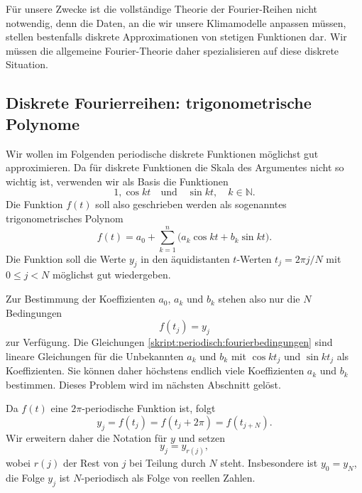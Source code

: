 Für unsere Zwecke ist die vollständige Theorie der Fourier-Reihen nicht
notwendig, denn die Daten, an die wir unsere Klimamodelle anpassen
müssen, stellen bestenfalls diskrete Approximationen von stetigen
Funktionen dar.
Wir müssen die allgemeine Fourier-Theorie daher spezialisieren auf diese
diskrete Situation.

\subsection{Diskrete Fourierreihen: trigonometrische Polynome}
Wir wollen im Folgenden periodische diskrete Funktionen möglichst gut
approximieren.
Da für diskrete Funktionen die Skala des Argumentes nicht so wichtig ist,
verwenden wir als Basis die Funktionen 
\begin{equation}
1,\cos kt\quad\text{und}\quad \sin kt,\quad k\in\mathbb N.
\end{equation}
Die Funktion $f(t)$ soll also geschrieben werden als sogenanntes 
trigonometrisches Polynom
\begin{equation}
f(t)
=
a_0 + \sum_{k=1}^n \bigl(a_k \cos kt + b_k\sin kt).
\label{skript:fourier:rekonstruktion}
\end{equation}
Die Funktion soll die Werte $y_j$ in den äquidistanten $t$-Werten 
$t_j=2\pi j/N$ mit $0\le j<N$ möglichst gut wiedergeben.

Zur Bestimmung der Koeffizienten $a_0$, $a_k$ und $b_k$ stehen also nur
die $N$ Bedingungen
\begin{equation}
f(t_j)=y_j
\label{skript:periodisch:fourierbedingungen}
\end{equation}
zur Verfügung.
Die Gleichungen \eqref{skript:periodisch:fourierbedingungen} sind
lineare Gleichungen für die Unbekannten $a_k$ und $b_k$ mit
$\cos kt_j$ und $\sin kt_j$ als Koeffizienten.
Sie können daher höchstens endlich viele Koeffizienten $a_k$ und $b_k$
bestimmen.
Dieses Problem wird im nächsten Abschnitt gelöst.

Da $f(t)$ eine $2\pi$-periodische Funktion ist, folgt
\[
y_j = f(t_j) = f(t_j+2\pi) = f(t_{j+N}).
\]
Wir erweitern daher die Notation für $y$ und setzen
\[
y_j = y_{r(j)},
\]
wobei $r(j)$ der Rest von $j$ bei Teilung durch $N$ steht.
Insbesondere ist $y_0=y_N$, die Folge $y_j$ ist $N$-periodisch als
Folge von reellen Zahlen.
